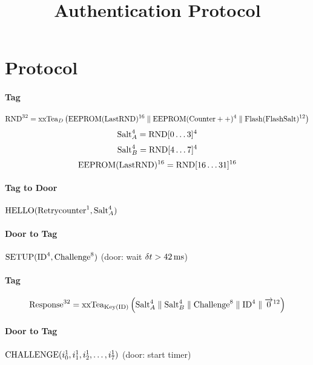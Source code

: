 \documentclass[a4paper,10pt]{scrartcl}
\title{\openbouncer{} Authentication Protocol}
\author{}
\begin{document}
\maketitle

\begin{abstract}

\end{abstract}

\section{Protocol}

\paragraph{Tag} $$\textnormal{RND}^{32} = \textnormal{xxTea}_D\left(\textnormal{EEPROM}(\textnormal{LastRND})^{16} \parallel \textnormal{EEPROM}(\textnormal{Counter}++)^{4} \parallel \textnormal{Flash}(\textnormal{FlashSalt})^{12} \right)$$
$$\textnormal{Salt}_A^{4} = \textnormal{RND}[0\ldots3]^{4}$$
$$\textnormal{Salt}_B^{4} = \textnormal{RND}[4\ldots7]^{4}$$
$$\textnormal{EEPROM}(\textnormal{LastRND})^{16} = \textnormal{RND}[16\ldots31]^{16}$$

\paragraph{Tag to Door} $\textnormal{HELLO}(\textnormal{Retrycounter}^1,\textnormal{Salt}_A^{4})$

\paragraph{Door to Tag} $\textnormal{SETUP}(\textnormal{ID}^{4}, \textnormal{Challenge}^{8})$
(door: wait $\delta t > 42\,\textnormal{ms}$)

\paragraph{Tag} $$\textnormal{Response}^{32} = \textnormal{xxTea}_{\textnormal{\scriptsize{Key}}(\textnormal{\scriptsize{ID})}}\left( \textnormal{Salt}_A^4 \parallel \textnormal{Salt}_B^4 \parallel \textnormal{Challenge}^8 \parallel \textnormal{ID}^4 \parallel \overrightarrow{0}^{12} \right)$$

\paragraph{Door to Tag} $\textnormal{CHALLENGE}(i_0^1, i_1^1, i_2^1, \ldots, i_7^1)$
(door: start timer)
\end{document}
